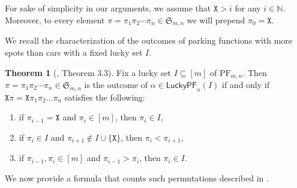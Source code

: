 \documentclass[reqno]{amsart}
\newcommand{\X}{\texttt{X}}
\newcommand{\Sym}{\mathfrak{S}}
\newcommand{\LPF}{\mathsf{LuckyPF}}
\newcommand{\PF}{\mathrm{PF}}
\theoremstyle{definition}
\newtheorem{theorem}{Theorem}[section]
\theoremstyle{remark}
\begin{document}
For sake of simplicity in our arguments, we assume that $\X>i$ for any $i\in \mathbb{N}$. 
Moreover, to every element $\pi=\pi_1\pi_2\cdots\pi_n\in\Sym_{m,n}$ we will prepend $\pi_0=\X$.

We recall the characterization of the outcomes of parking functions with more spots than cars with a fixed lucky set $I$.

\begin{theorem}[\cite{harrismartinez}, Theorem 3.3]\label{thm:characterizing outcomes in mn}
Fix a lucky set $I\subseteq[m]$  of $\PF_{m,n}$. Then $\pi=\pi_1\pi_2\cdots\pi_n\in \Sym_{m,n}$ is the outcome of $\alpha\in\LPF_n(I)$
if and only if $\X\pi=\X\pi_1\pi_2\ldots\pi_n$ satisfies the following:
\begin{enumerate}
    \item if $\pi_{i-1}=\X$ and $\pi_i\in[m]$, then $\pi_i\in I$, 

    \item if $\pi_i\in I$ and $ \pi_{i+1} \notin I\cup\{\X\}$, then $\pi_i<\pi_{i+1}$,

    \item if 
    $\pi_{i-1},\pi_{i}\in[m]$ and 
    $\pi_{i-1}>\pi_{i}$, then $\pi_{i}\in I$. 
\end{enumerate}
\end{theorem}

We now provide a formula that counts such permutations described in .
\end{document}
